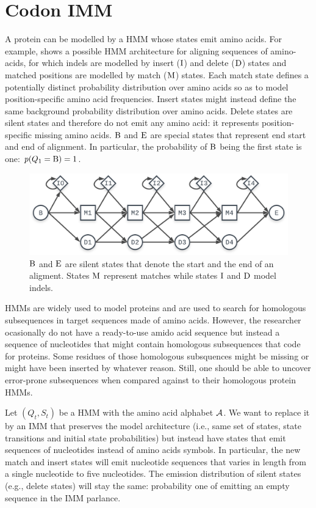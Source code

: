 \section{Codon IMM}

A protein can be modelled by a HMM whose states emit amino acids. For example,
 shows a possible HMM architecture for aligning sequences of amino-acids,
for which indels are modelled by insert ($\mathrm{I}$) and delete ($\mathrm{D}$) states and matched
positions are modelled by match ($\mathrm{M}$) states. Each match state defines a potentially
distinct probability distribution over amino acids so as to model position-specific amino acid
frequencies. Insert states might instead define the same background probability distribution over
amino acids. Delete states are silent states and therefore do not emit any amino acid: it represents
position-specific missing amino acids. $\mathrm{B}$ and $\mathrm{E}$ are special states that represent
end start and end of alignment. In particular, the probability of $\mathrm{B}$ being the first state
is one: $p(Q_1=\mathrm{B})=1$.

\begin{figure}[htbp]
  \centering
  \captionsetup{width=.5\linewidth}
  \includegraphics[width=.5\linewidth]{figure/core-model}
  \caption{$\mathrm{B}$ and $\mathrm{E}$ are silent states that denote the start and the end of an
  aligment. States $\mathrm{M}$ represent matches while states $\mathrm{I}$ and $\mathrm{D}$ model
  indels.}\label{fig:core-model}
\end{figure}

HMMs are widely used to model proteins and are used to search for homologous subsequences in target
sequences made of amino acids. However, the researcher ocasionally do not have a ready-to-use amido
acid sequence but instead a sequence of nucleotides that might contain homologous subsequences that
code for proteins. Some residues of those homologous subsquences might be missing or might have been
inserted by whatever reason. Still, one should be able to uncover error-prone subsequences when
compared against to their homologous protein HMMs.

Let $(Q_t, S_t)$ be a HMM with the amino acid alphabet $\mathcal{A}$. We want to replace it by an IMM
that preserves the model architecture (i.e., same set of states, state transitions and initial state
probabilities) but instead have states that emit sequences of nucleotides instead of amino acids
symbols. In particular, the new match and insert states will emit nucleotide sequences that varies
in length from a single nucleotide to five nucleotides. The emission distribution of silent states
(e.g., delete states) will stay the same: probability one of emitting an empty sequence in the IMM
parlance.

